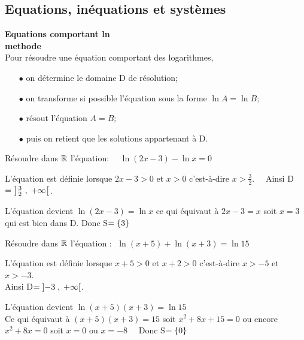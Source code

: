 \subsection*{Equations, inéquations et systèmes}
\textbf{Equations comportant ln}\\
\textbf{methode}\\
Pour résoudre une équation comportant des logarithmes,
\begin{itemize}
\item[$ \bullet$] on détermine le domaine D de résolution;
\item[$ \bullet$] on transforme si possible l'équation sous la forme $ \ln A=\ln B $;
\item[$ \bullet$] résout l'équation $ A=B $;
\item[$ \bullet$]  puis on retient que les solutions appartenant à D.
\end{itemize}
\begin{example} Résoudre dans $ \mathbb{R} $ l'équation: $\quad \ln (2x-3)-\ln x=0 $

L'équation est définie lorsque $2x-3>0$ et $ x>0$  c'est-à-dire $ x>\frac{3}{2}.\quad$ Ainsi D$ =\left]\frac{3}{2} \;,\; +\infty\right[ $.

L'équation devient  $ \ln (2x-3)=\ln x$  ce qui équivaut à $ 2x-3=x $  soit $ x=3 $ qui est bien dans D. Donc S$ =\left\{3\right\} $
\end{example}
\begin{example} Résoudre dans $ \mathbb{R} $ l'équation : $\; \ln (x+5)+\ln (x+3)=\ln15  $

L'équation est définie lorsque $x+5>0$ et $ x+2>0$  c'est-à-dire $ x>-5 $  et $ x>-3 $.\\   Ainsi D$ =\left]-3 \;,\; +\infty\right[ $.

L'équation devient  $ \ln (x+5)(x+3)=\ln 15$ \\Ce qui équivaut à $ (x+5)(x+3)=15 $  soit $ x^{2}+8x+15=0 $  ou encore $ x^{2}+8x=0 $  soit $x=0 $ ou $x=-8\quad $
 Donc S$ =\left\{0\right\} $
\end{example}

